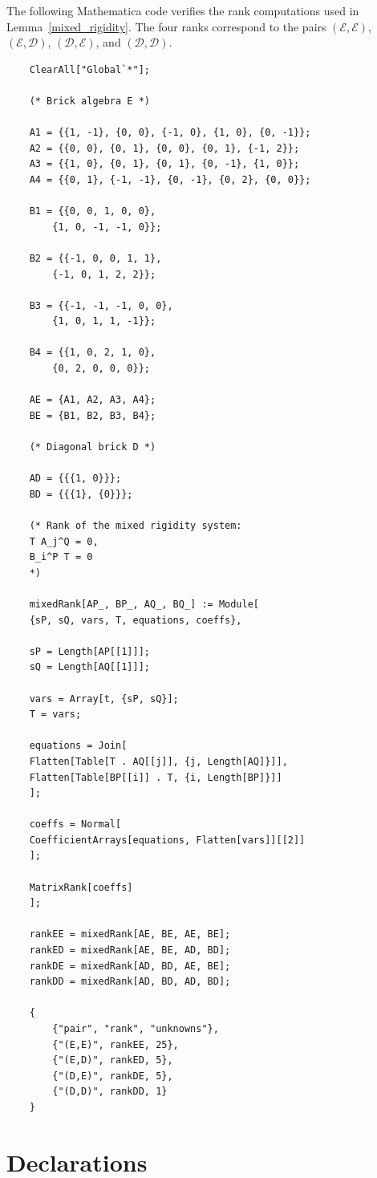 \documentclass[11pt]{article}
\theoremstyle{remark}
\theoremstyle{plain}
\theoremstyle{definition}
\theoremstyle{myremark}
\begin{document}
The following Mathematica code verifies the rank computations used in
Lemma~\ref{mixed_rigidity}. The four ranks correspond to the pairs
\((\mathcal E,\mathcal E)\), \((\mathcal E,\mathcal D)\),
\((\mathcal D,\mathcal E)\), and \((\mathcal D,\mathcal D)\).

\begin{lstlisting}
	ClearAll["Global`*"];
	
	(* Brick algebra E *)
	
	A1 = {{1, -1}, {0, 0}, {-1, 0}, {1, 0}, {0, -1}};
	A2 = {{0, 0}, {0, 1}, {0, 0}, {0, 1}, {-1, 2}};
	A3 = {{1, 0}, {0, 1}, {0, 1}, {0, -1}, {1, 0}};
	A4 = {{0, 1}, {-1, -1}, {0, -1}, {0, 2}, {0, 0}};
	
	B1 = {{0, 0, 1, 0, 0},
		{1, 0, -1, -1, 0}};
	
	B2 = {{-1, 0, 0, 1, 1},
		{-1, 0, 1, 2, 2}};
	
	B3 = {{-1, -1, -1, 0, 0},
		{1, 0, 1, 1, -1}};
	
	B4 = {{1, 0, 2, 1, 0},
		{0, 2, 0, 0, 0}};
	
	AE = {A1, A2, A3, A4};
	BE = {B1, B2, B3, B4};
	
	(* Diagonal brick D *)
	
	AD = {{{1, 0}}};
	BD = {{{1}, {0}}};
	
	(* Rank of the mixed rigidity system:
	T A_j^Q = 0,
	B_i^P T = 0
	*)
	
	mixedRank[AP_, BP_, AQ_, BQ_] := Module[
	{sP, sQ, vars, T, equations, coeffs},
	
	sP = Length[AP[[1]]];
	sQ = Length[AQ[[1]]];
	
	vars = Array[t, {sP, sQ}];
	T = vars;
	
	equations = Join[
	Flatten[Table[T . AQ[[j]], {j, Length[AQ]}]],
	Flatten[Table[BP[[i]] . T, {i, Length[BP]}]]
	];
	
	coeffs = Normal[
	CoefficientArrays[equations, Flatten[vars]][[2]]
	];
	
	MatrixRank[coeffs]
	];
	
	rankEE = mixedRank[AE, BE, AE, BE];
	rankED = mixedRank[AE, BE, AD, BD];
	rankDE = mixedRank[AD, BD, AE, BE];
	rankDD = mixedRank[AD, BD, AD, BD];
	
	{
		{"pair", "rank", "unknowns"},
		{"(E,E)", rankEE, 25},
		{"(E,D)", rankED, 5},
		{"(D,E)", rankDE, 5},
		{"(D,D)", rankDD, 1}
	}
\end{lstlisting}


\section*{Declarations}
\end{document}
